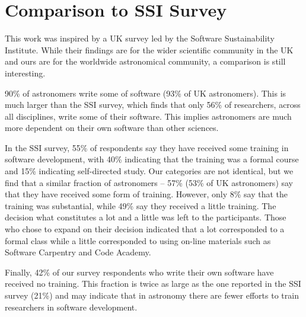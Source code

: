 \section{Comparison to SSI Survey}
\label{sec:ssicompare}

This work was inspired by a UK survey led by the Software Sustainability Institute. While their findings are for the wider scientific community in the UK and ours are for the worldwide astronomical community, a comparison is still interesting. 

90\% of astronomers write some of software (93\% of UK astronomers). This is much larger than the SSI survey, which finds that only 56\% of researchers, across all disciplines, write some of their software.  This implies astronomers are much more dependent on their own software than other sciences.

In the SSI survey, 55\% of respondents say they have received some training in software development, with 40\% indicating that the training was a formal course and 15\% indicating self-directed study. Our categories are not identical, but we find that a similar fraction of astronomers -- 57\% (53\% of UK astronomers) say that they have received some form of training. However, only 8\% say that the training was substantial, while 49\% say they received a little training. The decision what constitutes a lot and a little was left to the participants. Those who chose to expand on their decision indicated that a lot corresponded to a formal class while a little corresponded to using on-line materials such as Software Carpentry and Code Academy.

Finally, 42\% of our survey respondents who write their own software have received no training. This fraction is twice as large as the one reported in the SSI survey (21\%) and may indicate that in astronomy there are fewer efforts to train researchers in software development.


